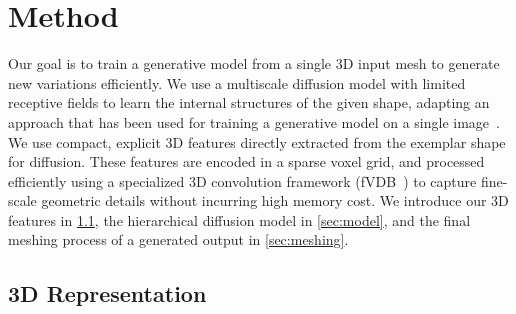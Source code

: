
\section{Method}
\label{sec:method}

Our goal is to train a generative model from a single 3D input mesh to generate new variations efficiently.
We use a multiscale diffusion model with limited receptive fields to learn the internal structures of the given shape, adapting an approach that has been used for training a generative model on a single image~\cite{kulikov2023sinddm}.
We use compact, explicit 3D features directly extracted from the exemplar shape for diffusion.
These features are encoded in a sparse voxel grid, and processed efficiently using a specialized 3D convolution framework (fVDB~\cite{williams2024fvdb}) to capture fine-scale geometric details without incurring high memory cost.
We introduce our 3D features in \cref{sec:sparse-representation}, the hierarchical diffusion model in \cref{sec:model}, and the final meshing process of a generated output in \cref{sec:meshing}.
\vspace*{2mm}

\subsection{3D Representation}
\label{sec:sparse-representation}

